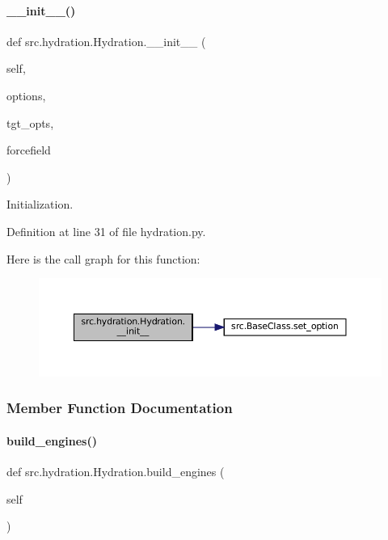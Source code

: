 \paragraph{\texorpdfstring{\+\_\+\+\_\+init\+\_\+\+\_\+()}{\_\_init\_\_()}}
{\footnotesize\ttfamily def src.\+hydration.\+Hydration.\+\_\+\+\_\+init\+\_\+\+\_\+ (\begin{DoxyParamCaption}\item[{}]{self,  }\item[{}]{options,  }\item[{}]{tgt\+\_\+opts,  }\item[{}]{forcefield }\end{DoxyParamCaption})}



Initialization. 



Definition at line 31 of file hydration.\+py.

Here is the call graph for this function\+:
\nopagebreak
\begin{figure}[H]
\begin{center}
\leavevmode
\includegraphics[width=350pt]{classsrc_1_1hydration_1_1Hydration_a367023ded700f1b67e3b26d3869c6c7b_cgraph}
\end{center}
\end{figure}


\subsubsection{Member Function Documentation}
\mbox{\label{classsrc_1_1hydration_1_1Hydration_a8da7e34334a6872393258829726d2407}} 
\paragraph{\texorpdfstring{build\+\_\+engines()}{build\_engines()}}
{\footnotesize\ttfamily def src.\+hydration.\+Hydration.\+build\+\_\+engines (\begin{DoxyParamCaption}\item[{}]{self }\end{DoxyParamCaption})}



